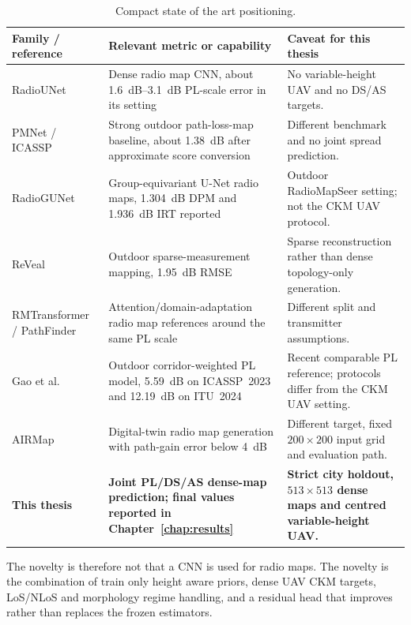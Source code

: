 \begin{table}[htbp]
\centering
\caption{Compact state of the art positioning.}
\label{tab:position}
\scriptsize
\setlength{\tabcolsep}{3pt}
\begin{tabularx}{\textwidth}{p{}p{}X}
\toprule
Family / reference & Relevant metric or capability & Caveat for this thesis \\
\midrule
RadioUNet \cite{radiounet2020} & Dense radio map CNN, about \SI{1.6}{dB}--\SI{3.1}{dB} PL-scale error in its setting & No variable-height UAV and no DS/AS targets. \\
PMNet / ICASSP \cite{pmnet_icassp2023,icassp2023challenge} & Strong outdoor path-loss-map baseline, about \SI{1.38}{dB} after approximate score conversion & Different benchmark and no joint spread prediction. \\
RadioGUNet \cite{radiogunet2025} & Group-equivariant U-Net radio maps, \SI{1.304}{dB} DPM and \SI{1.936}{dB} IRT reported & Outdoor RadioMapSeer setting; not the CKM UAV protocol. \\
ReVeal \cite{reveal2025} & Outdoor sparse-measurement mapping, \SI{1.95}{dB} RMSE & Sparse reconstruction rather than dense topology-only generation. \\
RMTransformer / PathFinder \cite{rmtransformer2025,pathfinder2025} & Attention/domain-adaptation radio map references around the same PL scale & Different split and transmitter assumptions. \\
Gao et al.\ \cite{gao2026} & Outdoor corridor-weighted PL model, \SI{5.59}{dB} on ICASSP~2023 and \SI{12.19}{dB} on ITU~2024 & Recent comparable PL reference; protocols differ from the CKM UAV setting. \\
AIRMap \cite{airmap2025} & Digital-twin radio map generation with path-gain error below \SI{4}{dB} & Different target, fixed \(200\times200\) input grid and evaluation path. \\
\textbf{This thesis} & \textbf{Joint PL/DS/AS dense-map prediction; final values reported in Chapter~\ref{chap:results}} & \textbf{Strict city holdout, \(513\times513\) dense maps and centred variable-height UAV.} \\
\bottomrule
\end{tabularx}
\end{table}

The novelty is therefore not that a CNN is used for radio maps. The novelty is
the combination of train only height aware priors, dense UAV CKM targets,
LoS/NLoS and morphology regime handling, and a residual head that improves
rather than replaces the frozen estimators.
